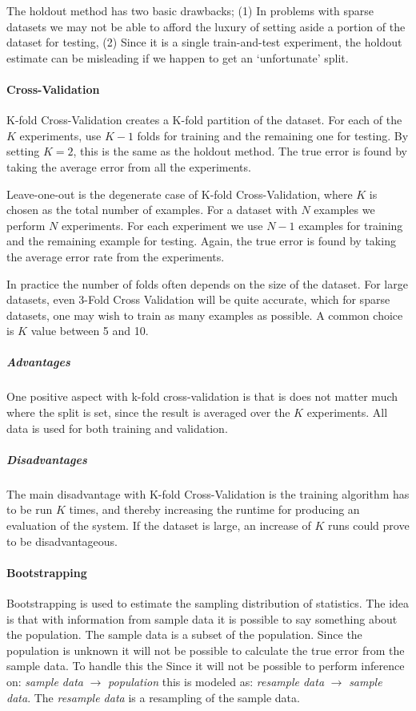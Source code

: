 The holdout method has two basic drawbacks; (1) In problems with sparse
datasets we may not be able to afford the luxury of setting aside a portion of
the dataset for testing, (2) Since it is a single train-and-test experiment,
the holdout estimate can be misleading if we happen to get an `unfortunate'
split.

\paragraph{Cross-Validation}
K-fold Cross-Validation creates a K-fold partition of the dataset. For each of
the $K$ experiments, use $K-1$ folds for training and the remaining one for
testing. By setting $K=2$, this is the same as the holdout method. The true
error is found by taking the average error from all the experiments.

Leave-one-out is the degenerate case of K-fold Cross-Validation, where $K$ is
chosen as the total number of examples. For a dataset with $N$ examples we
perform $N$ experiments. For each experiment we use $N-1$ examples for training
and the remaining example for testing. Again, the true error is found by taking
the average error rate from the experiments.

In practice the number of folds often depends on the size of the dataset. For
large datasets, even 3-Fold Cross Validation will be quite accurate, which for
sparse datasets, one may wish to train as many examples as possible. A common
choice is $K$ value between 5 and 10.

\subparagraph{Advantages}
One positive aspect with k-fold cross-validation is that is does not matter much where the split is set, since the result is averaged over the $K$ experiments.
All data is used for both training and validation.

\subparagraph{Disadvantages}
The main disadvantage with K-fold Cross-Validation is the training algorithm has to be run $K$ times, and thereby increasing the runtime for producing an evaluation of the system.
If the dataset is large, an increase of $K$ runs could prove to be disadvantageous.

\paragraph{Bootstrapping~\cite{efron1994introduction}}
Bootstrapping is used to estimate the sampling distribution of statistics. %
The idea is that with information from sample data it is possible to say something about the population.
The sample data is a subset of the population.
Since the population is unknown it will not be possible to calculate the true error from the sample data.
To handle this the
Since it will not be possible to perform inference on:
\emph{sample data} $\rightarrow$ \emph{population} this is modeled as:
\emph{resample data} $\rightarrow$ \emph{sample data}.
The \emph{resample data} is a resampling of the sample data.

